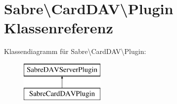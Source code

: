 \hypertarget{class_sabre_1_1_card_d_a_v_1_1_plugin}{}\section{Sabre\textbackslash{}Card\+D\+AV\textbackslash{}Plugin Klassenreferenz}
\label{class_sabre_1_1_card_d_a_v_1_1_plugin}
Klassendiagramm für Sabre\textbackslash{}Card\+D\+AV\textbackslash{}Plugin\+:\begin{figure}[H]
\begin{center}
\leavevmode
\includegraphics[height=2.000000cm]{class_sabre_1_1_card_d_a_v_1_1_plugin}
\end{center}
\end{figure}
